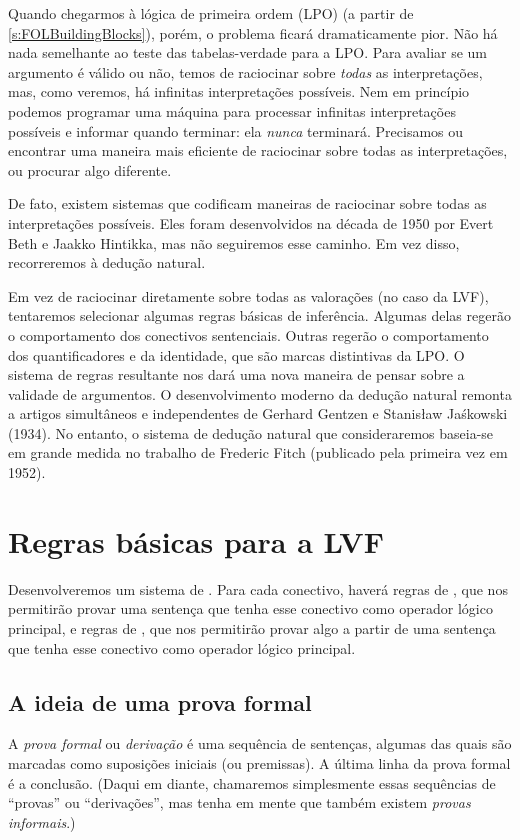 Quando chegarmos à lógica de primeira ordem (LPO) (a partir de \cref{s:FOLBuildingBlocks}), porém, o problema ficará dramaticamente pior. Não há nada semelhante ao teste das tabelas-verdade para a LPO. Para avaliar se um argumento é válido ou não, temos de raciocinar sobre \emph{todas} as interpretações, mas, como veremos, há infinitas interpretações possíveis. Nem em princípio podemos programar uma máquina para processar infinitas interpretações possíveis e informar quando terminar: ela \emph{nunca} terminará. Precisamos ou encontrar uma maneira mais eficiente de raciocinar sobre todas as interpretações, ou procurar algo diferente.

De fato, existem sistemas que codificam maneiras de raciocinar sobre todas as interpretações possíveis. Eles foram desenvolvidos na década de 1950 por Evert Beth e Jaakko Hintikka, mas não seguiremos esse caminho. Em vez disso, recorreremos à dedução natural.

Em vez de raciocinar diretamente sobre todas as valorações (no caso da LVF), tentaremos selecionar algumas regras básicas de inferência. Algumas delas regerão o comportamento dos conectivos sentenciais. Outras regerão o comportamento dos quantificadores e da identidade, que são marcas distintivas da LPO. O sistema de regras resultante nos dará uma nova maneira de pensar sobre a validade de argumentos.
O desenvolvimento moderno da dedução natural remonta a artigos simultâneos e independentes de Gerhard Gentzen e Stanis\l{}aw Ja\'{s}kowski (1934). No entanto, o sistema de dedução natural que consideraremos baseia-se em grande medida no trabalho de Frederic Fitch (publicado pela primeira vez em 1952).


\chapter{Regras básicas para a LVF}\label{s:BasicTFL}
Desenvolveremos um sistema de . Para cada conectivo, haverá regras de , que nos permitirão provar uma sentença que tenha esse conectivo como operador lógico principal, e regras de , que nos permitirão provar algo a partir de uma sentença que tenha esse conectivo como operador lógico principal.

\section{A ideia de uma prova formal}
A \emph{prova formal} ou \emph{derivação} é uma sequência de sentenças,
algumas das quais são marcadas como suposições iniciais (ou premissas).
A última linha da prova formal é a conclusão. (Daqui em diante,
chamaremos simplesmente essas sequências de \textquotedblleft provas\textquotedblright{} ou \textquotedblleft derivações\textquotedblright{}, mas tenha em mente que também existem \emph{provas informais}.)

